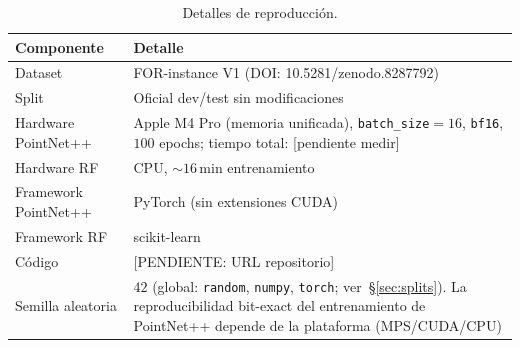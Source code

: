\documentclass[runningheads]{llncs}
\begin{document}
\begin{table}[h]
\centering
\caption{Detalles de reproducci\'on.}\label{tab:repro}
\begin{tabular}{ll}
\toprule
Componente & Detalle \\
\midrule
Dataset              & FOR-instance V1 (DOI: 10.5281/zenodo.8287792)  \\
Split                & Oficial dev/test sin modificaciones             \\
Hardware PointNet++  & Apple M4 Pro (memoria unificada), \texttt{batch\_size}$=16$, \texttt{bf16}, $100$ epochs; tiempo total: [pendiente medir] \\
Hardware RF          & CPU, ${\sim}16$\,min entrenamiento              \\
Framework PointNet++ & PyTorch (sin extensiones CUDA)                  \\
Framework RF         & scikit-learn                                    \\
C\'odigo             & [PENDIENTE: URL repositorio]                    \\
Semilla aleatoria    & $42$ (global: \texttt{random}, \texttt{numpy}, \texttt{torch}; ver~\S\ref{sec:splits}). La reproducibilidad bit-exact del entrenamiento de PointNet++ depende de la plataforma (MPS/CUDA/CPU) \\
\bottomrule
\end{tabular}
\end{table}
\end{document}
